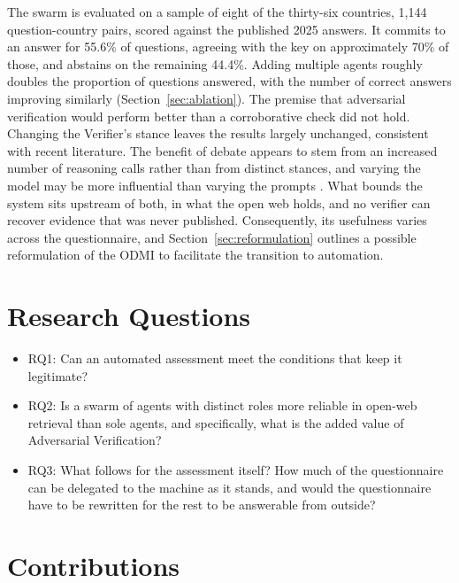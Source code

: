 The swarm is evaluated on a sample of eight of the thirty-six countries, 1,144 question-country pairs, scored against the published 2025 answers. It commits to an answer for 55.6\% of questions, agreeing with the key on approximately 70\% of those, and abstains on the remaining 44.4\%. Adding multiple agents roughly doubles the proportion of questions answered, with the number of correct answers improving similarly (Section~\ref{sec:ablation}). The premise that adversarial verification would perform better than a corroborative check did not hold. Changing the Verifier's stance leaves the results largely unchanged, consistent with recent literature. The benefit of debate appears to stem from an increased number of reasoning calls rather than from distinct stances, and varying the model may be more influential than varying the prompts \citep{chowdhury2026,zhu2026}. What bounds the system sits upstream of both, in what the open web holds, and no verifier can recover evidence that was never published. Consequently, its usefulness varies across the questionnaire, and Section~\ref{sec:reformulation} outlines a possible reformulation of the ODMI to facilitate the transition to automation.


\section{Research Questions}\label{sec:research-questions}

\begin{itemize}
  \item RQ1: Can an automated assessment meet the conditions that keep it legitimate?
  \item RQ2: Is a swarm of agents with distinct roles more reliable in open-web retrieval than sole agents, and specifically, what is the added value of Adversarial Verification?
  \item RQ3: What follows for the assessment itself? How much of the questionnaire can be delegated to the machine as it stands, and would the questionnaire have to be rewritten for the rest to be answerable from outside?
\end{itemize}


\section{Contributions}\label{sec:contributions}

